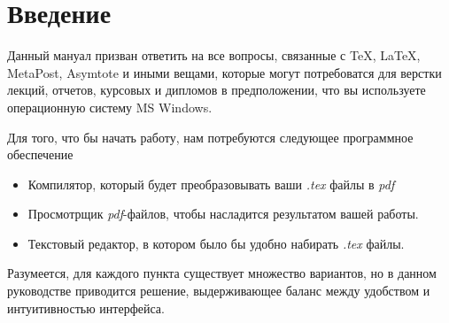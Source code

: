 \section{Введение}
Данный мануал призван ответить на все вопросы, связанные с \TeX{},
\LaTeX{}, MetaPost, Asymtote и иными вещами, которые могут 
потребоватся для верстки лекций, отчетов, курсовых и дипломов в предположении, 
что вы используете операционную систему MS Windows. 

Для того, что бы начать работу, нам потребуются следующее программное обеспечение
\begin{itemize}
\item Компилятор, который будет преобразовывать ваши {\it .tex} файлы в {\it pdf}
\item Просмотрщик {\it pdf}-файлов, чтобы насладится результатом вашей работы.
\item Текстовый редактор, в котором было бы удобно набирать {\it .tex} файлы.
\end{itemize}
Разумеется, для каждого пункта существует множество вариантов, но в
данном руководстве приводится решение, выдерживающее баланс между
удобством и интуитивностью интерфейса.
